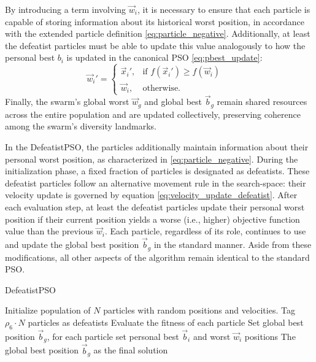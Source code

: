 {By introducing a term involving $\vec{w}_i$, it is necessary to ensure that each particle is capable of storing information about its historical worst position, in accordance with the extended particle definition \eqref{eq:particle_negative}. Additionally, at least the defeatist particles must be able to update this value analogously to how the personal best  $b_i$ is updated in the canonical PSO \eqref{eq:pbest_update}:
\begin{equation}
\vec{w}_i' = 
    \begin{cases}
    \vec{x}_i', & \text{if } f(\vec{x}_i') \geq f(\vec{w}_i) \\ %
    \vec{w}_i, & \text{otherwise.}
    \end{cases}
\quad \label{eq:pworst_update_defeatist}
\end{equation}
Finally, the swarm's global worst $\vec{w}_g$ and global best $\vec{b}_g$ remain shared resources across the entire population and are updated collectively, preserving coherence among the swarm’s diversity landmarks.


In the DefeatistPSO, the particles additionally maintain information about their personal worst position, as characterized in \eqref{eq:particle_negative}. During the initialization phase, a fixed fraction of particles is designated as defeatists. These defeatist particles follow an alternative movement rule in the \gls{search-space}: their velocity update is governed by equation \eqref{eq:velocity_update_defeatist}. After each evaluation step, at least the defeatist particles update their personal worst position if their current position yields a worse (i.e., higher) objective function value than the previous $\vec{w}_i$. Each particle, regardless of its role, continues to use and update the global best position $\vec{b}_g$ in the standard manner. Aside from these modifications, all other aspects of the algorithm remain identical to the standard PSO.

\vspace{.935em}
\begin{algorithm}[H]
\caption{DefeatistPSO}\label{alg:defeatist}
Initialize population of \(N\) particles with random positions and velocities. Tag \(\rho_6 \cdot N\) particles as defeatists\;
Evaluate the fitness of each particle\;
Set global best position \(\vec{b}_g\), for each particle set personal best \(\vec{b}_i\) and worst \(\vec{w}_i\) positions\;
\Return The global best position \(\vec{b}_g\) as the final solution\;
\end{algorithm}
\vspace{.535em}


}
